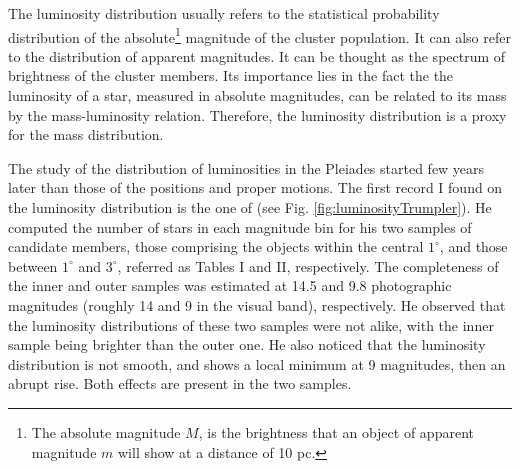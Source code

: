 The luminosity distribution usually refers to the statistical probability distribution of the absolute\footnote{The absolute magnitude $M$, is the brightness that an object of apparent magnitude $m$ will show at a distance of 10 pc.} magnitude of the cluster population. It can also refer to the distribution of apparent magnitudes. It can be thought as the spectrum of brightness of the cluster members. Its importance lies in the fact the the luminosity of a star, measured in absolute magnitudes, can be related to its mass by the mass-luminosity relation. Therefore, the luminosity distribution is a proxy for the mass distribution. 

The study of the distribution of luminosities in the Pleiades started few years later than those of the positions and proper motions. The first record I found on the luminosity distribution is the one of \citet{Trumpler1921} (see Fig. \ref{fig:luminosityTrumpler}). He computed the number of stars in each magnitude bin for his two samples of candidate members, those comprising the objects within the central $1^{\circ}$, and those between $1^{\circ}$ and $3^{\circ}$, referred as Tables I and II, respectively. The completeness of the inner and outer samples was estimated at 14.5 and  9.8 photographic magnitudes (roughly 14 and 9 in the visual band), respectively. He observed that the luminosity distributions of these two samples were not alike, with the inner sample being brighter than the outer one. He also noticed that the luminosity distribution is not smooth, and shows a local minimum at 9 magnitudes, then an abrupt rise. Both effects are present in the two samples.

